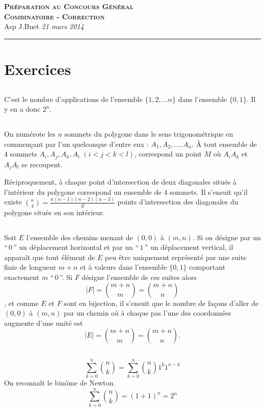 \documentclass[10pt,a4paper]{article}
\newcommand{\Titre}[3]{\begin{center} {\LARGE\textbf{\textsc{#1}}}\\ #2 \hfill \emph{#3} \\  \hrule\vspace{\baselineskip}\end{center}}
\begin{document}
\Titre{Préparation au Concours Général \\ Combinatoire - Correction}{Asp J.Buet}{21 mars 2014}
\thispagestyle{plain}
\pagestyle{plain}


\section{Exercices}
\subsection{}
C'est le nombre d'applications de l'ensemble $\{1,2,...n\}$ dans l'ensemble $\{0,1\}$. Il y en a donc $2^n$.
\subsection{}
On numérote les $n$ sommets du polygone dans le sens trigonométrique en commençant par l'un quelconque d'entre eux : $A_1, A_2, ..., A_n$. \`A tout ensemble 
de $4$ sommets $A_i, A_j, A_k, A_l$ $(i<j<k<l)$, correspond un point $M$ où $A_iA_k$ et $A_jA_l$ se recoupent.

Réciproquement, à chaque point d'intersection de deux diagonales situés à l'intérieur du polygone correspond un ensemble de $4$ sommets. Il s'ensuit qu'il 
existe $\binom{n}{4}=\frac{n(n-1)(n-2)(n-3)}{4!}$ points d'intersection des diagonales du polygone situés en son intérieur.
\subsection{}
Soit $E$ l'ensemble des chemins menant de $(0,0)$ à $(m,n)$. Si on désigne par un ``\,$0$\,'' un déplacement horizontal et par un ``\,$1$\,'' un déplacement
vertical, il apparaît que tout élément de $E$ peu être uniquement représenté par une suite finie de longueur $m+n$ et à valeurs dans l'ensemble $\{0,1\}$
comportant exactement $m$ ``\,$0$\,''. Si $F$ désigne l'ensemble de ces suites alors $$|F|=\binom{m+n}{m}=\binom{m+n}{n}$$, et comme $E$ et $F$ sont en 
bijection, il s'ensuit que le nombre de façons d'aller de $(0,0)$ à $(m,n)$ par un chemin où à chaque pas l'une des coordonnées augmente d'une unité est 
$$\boxed{|E|=\binom{m+n}{m}=\binom{m+n}{n}.}$$
\subsection{}
$$\sum\limits_{k=0}^n\binom{n}{k}=\sum\limits_{k=0}^n\binom{n}{k}1^k1^{n-k}$$
On reconnaît le binôme de Newton.
$$\boxed{\sum\limits_{k=0}^n\binom{n}{k}=(1+1)^n=2^n}$$
\end{document}
